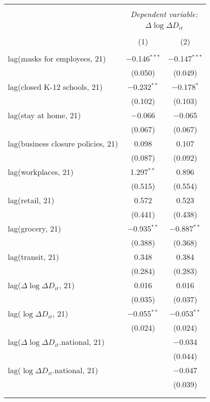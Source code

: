 \begin{tabular}{@{\extracolsep{1pt}}lcc} 
\\[-1.8ex]\hline 
\hline \\[-1.8ex] 
 & \multicolumn{2}{c}{\textit{Dependent variable:}} \\ 
\cline{2-3} 
 & \multicolumn{2}{c}{$\Delta \log \Delta D_{it}$} \\ 
\\[-1.8ex] & (1) & (2)\\ 
\hline \\[-1.8ex] 
 lag(masks for employees, 21) & $-$0.146$^{***}$ & $-$0.147$^{***}$ \\ 
  & (0.050) & (0.049) \\ 
  lag(closed K-12 schools, 21) & $-$0.232$^{**}$ & $-$0.178$^{*}$ \\ 
  & (0.102) & (0.103) \\ 
  lag(stay at home, 21) & $-$0.066 & $-$0.065 \\ 
  & (0.067) & (0.067) \\ 
  lag(business closure policies, 21) & 0.098 & 0.107 \\ 
  & (0.087) & (0.092) \\ 
  lag(workplaces, 21) & 1.297$^{**}$ & 0.896 \\ 
  & (0.515) & (0.554) \\ 
  lag(retail, 21) & 0.572 & 0.523 \\ 
  & (0.441) & (0.438) \\ 
  lag(grocery, 21) & $-$0.935$^{**}$ & $-$0.887$^{**}$ \\ 
  & (0.388) & (0.368) \\ 
  lag(transit, 21) & 0.348 & 0.384 \\ 
  & (0.284) & (0.283) \\ 
  lag($\Delta \log \Delta D_{it}$, 21) & 0.016 & 0.016 \\ 
  & (0.035) & (0.037) \\ 
  lag($\log \Delta D_{it}$, 21) & $-$0.055$^{**}$ & $-$0.053$^{**}$ \\ 
  & (0.024) & (0.024) \\ 
  lag($\Delta \log \Delta D_{it}$.national, 21) &  & $-$0.034 \\ 
  &  & (0.044) \\ 
  lag($\log \Delta D_{it}$.national, 21) &  & $-$0.047 \\ 
  &  & (0.039) \\ 
   &  &  \\ 
  &  &  \\ 

\end{tabular}
